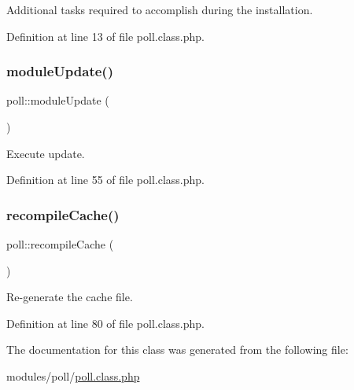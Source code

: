 Additional tasks required to accomplish during the installation. 



Definition at line 13 of file poll.\+class.\+php.

\mbox{\label{classpoll_a3d8f63f173e74e8a19c61ee06f4ac02f}} 
\subsubsection{\texorpdfstring{module\+Update()}{moduleUpdate()}}
{\footnotesize\ttfamily poll\+::module\+Update (\begin{DoxyParamCaption}{ }\end{DoxyParamCaption})}



Execute update. 



Definition at line 55 of file poll.\+class.\+php.

\mbox{\label{classpoll_af1f9c058e0e622c4356cda133f9b988e}} 
\subsubsection{\texorpdfstring{recompile\+Cache()}{recompileCache()}}
{\footnotesize\ttfamily poll\+::recompile\+Cache (\begin{DoxyParamCaption}{ }\end{DoxyParamCaption})}



Re-\/generate the cache file. 



Definition at line 80 of file poll.\+class.\+php.



The documentation for this class was generated from the following file\+:\begin{DoxyCompactItemize}
\item 
modules/poll/\hyperlink{poll_8class_8php}{poll.\+class.\+php}\end{DoxyCompactItemize}
